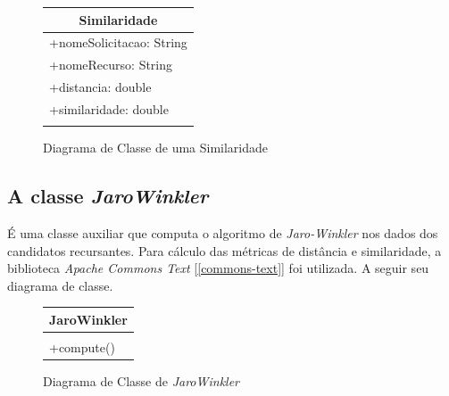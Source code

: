 \documentclass[
	12pt,			%
	openright,		%
	oneside,	
	a4paper,		%
	english,		%
	brazil			%
]{abntex2/abntex2}  %
\begin{document}
				\begin{figure}[ht]
					\begin{center}
						
						\caption{Diagrama de Classe de uma Similaridade}
						\label{similaridade-uml}
						
						\begin{tabular}{|l|}
							\hline
							\multicolumn{1}{|c|}{\textbf{Similaridade}} \\ \hline
							+nomeSolicitacao: String                    \\
							+nomeRecurso: String                        \\
							+distancia: double                          \\
							+similaridade: double                       \\ \hline
							\\ \hline
						\end{tabular}
						
					\end{center}
				\end{figure}

			\subsection{A classe \textit{JaroWinkler}}
			
				É uma classe auxiliar que computa o algoritmo de \textit{Jaro-Winkler} \cite{jaro-winkler} nos dados dos candidatos recursantes. Para cálculo das métricas de distância e similaridade, a biblioteca \textit{Apache Commons Text\texttrademark} [\ref{commons-text}] foi utilizada. A seguir seu diagrama de classe.
			
				\begin{figure}[ht]
					\begin{center}
						
						\caption{Diagrama de Classe de \textit{JaroWinkler}}
						\label{jaro-winkler-uml}
						
						\begin{tabular}{|l|}
							\hline
							\multicolumn{1}{|c|}{\textbf{JaroWinkler}} \\ \hline
							\\ \hline
							+compute()                                \\ \hline
						\end{tabular}
						
					\end{center}
				\end{figure}
\end{document}
